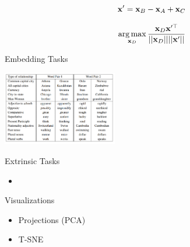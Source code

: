 \documentclass{beamer}
\begin{document}
\begin{frame}
  \[ \mathbf{x}' = \mathbf{x}_{B} - \mathbf{x}_{A} + \mathbf{x}_{C} \]

  \[ \argmax_{\boldx_D}\frac{\boldx_{D} \boldx'^{\top}}{||\boldx_{D} || || \boldx'||  } \]
\end{frame}

\begin{frame}{Embedding Tasks}
  \begin{center}
    \includegraphics[width=5cm]{analogy}
  \end{center}
\end{frame}


\begin{frame}{Extrinsic Tasks}
  \begin{itemize}
  \item
  \end{itemize}
\end{frame}


\begin{frame}{Visualizations}
  \begin{itemize}
  \item Projections (PCA)
  \item T-SNE
  \end{itemize}
\end{frame}
\end{document}
